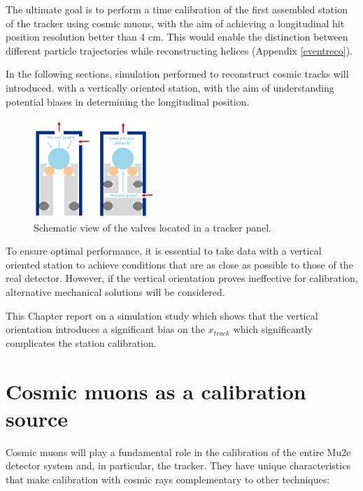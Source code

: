 The ultimate goal is to perform a time calibration of 
the first assembled station of the tracker using 
cosmic muons, with the aim of achieving a longitudinal hit 
position resolution better than 4 cm. This would enable the distinction 
between different particle trajectories while reconstructing helices (Appendix \ref{eventreco}).

In the following sections, simulation performed to reconstruct cosmic tracks will introduced. 
with a vertically oriented station, with the aim of understanding 
potential biases in determining the longitudinal position.

\begin{figure}[!h]
    \centering
    \includegraphics[width =0.4\textwidth]{figures/png/gassystem.png}
    \caption[Schematic view of the valves located in a tracker panel.]{Schematic view of the valves located in a tracker panel.}
    \label{fig:gassystem}
\end{figure}
To ensure optimal performance, it is essential to take data with a vertical oriented station 
to achieve conditions that are as close as possible to those of the real detector. 
However, if the vertical orientation proves ineffective for calibration, 
alternative mechanical solutions will be considered.

This Chapter report on a simulation study 
which shows that the vertical orientation introduces a significant bias on 
the $x_{track}$ which significantly complicates 
the station calibration. 



\section{Cosmic muons as a calibration source}
Cosmic muons will play a fundamental role in the 
calibration of the entire Mu2e detector system and, 
in particular, the tracker. They have unique 
characteristics that make calibration with cosmic rays 
complementary to other techniques:

 

